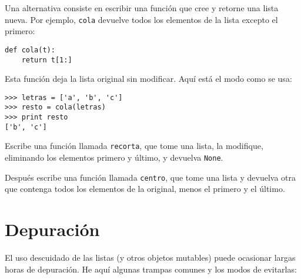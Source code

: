 
Una alternativa consiste en escribir una función que cree y
retorne una lista nueva. Por ejemplo,
{\tt cola} devuelve todos los elementos de la lista
excepto el primero:

\beforeverb
\begin{verbatim}
def cola(t):
    return t[1:]
\end{verbatim}
\afterverb
%
Esta función deja la lista original sin modificar.
Aquí está el modo como se usa:

\beforeverb
\begin{verbatim}
>>> letras = ['a', 'b', 'c']
>>> resto = cola(letras)
>>> print resto
['b', 'c']
\end{verbatim}
\afterverb


\begin{ex}

Escribe una función llamada {\tt recorta}, que tome una lista, la
modifique, eliminando los elementos primero y último, y devuelva {\tt None}.

Después escribe una función llamada {\tt centro}, que tome una lista y
devuelva otra que contenga todos los elementos de la original,
menos el primero y el último.

\end{ex}


\section{Depuración}

El uso descuidado de las listas (y otros objetos mutables)
puede ocasionar largas horas de depuración. He aquí algunas
trampas comunes y los modos de evitarlas:

